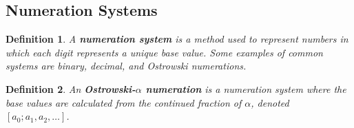 \documentclass[landscape]{sciposter}
\newtheorem*{definition}{Definition}
\begin{document}
\begin{multicols}{3}



\begin{mdframed}[style=MyFrame]
\subsection*{Numeration Systems}
\end{mdframed}
\begin{definition}A \textbf{numeration system} is a method used to represent numbers in which each digit represents a unique base value. Some examples of common systems are binary, decimal, and Ostrowski numerations.
\end{definition}
\begin{definition}
An \textbf{Ostrowski-$\alpha$ numeration} is a numeration system where the base values are calculated from the continued fraction of $\alpha$, denoted $[a_0; a_{1},a_{2}, \ldots]$.


\end{definition}
\end{multicols}
\end{document}
